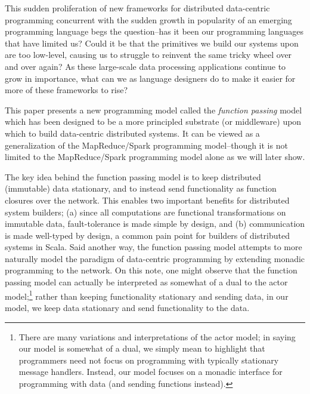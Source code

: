 \documentclass[10pt]{sigplanconf}
\theoremstyle{definition}
\theoremstyle{definition}
\begin{document}

This sudden proliferation of new frameworks for distributed data-centric
programming concurrent with the sudden growth in popularity of an emerging
programming language begs the question--has it been our programming languages
that have limited us? Could it be that the primitives we build our systems upon
are too low-level, causing us to struggle to reinvent the same tricky wheel over
and over again? As these large-scale data processing applications continue to
grow in importance, what can we as language designers do to make it easier for
more of these frameworks to rise?

This paper presents a new programming model called the {\em function passing}
model which has been designed to be a more principled substrate (or middleware)
upon which to build data-centric distributed systems. It can be viewed as a
generalization of the MapReduce/Spark programming model--though it is not
limited to the MapReduce/Spark programming model alone as we will later show.

The key idea behind the function passing model is to keep distributed
(immutable) data stationary, and to instead send functionality as function
closures over the network. This enables two important benefits for distributed
system builders; (a) since all computations are functional transformations on
immutable data, fault-tolerance is made simple by design, and (b) communication
is made well-typed by design, a common pain point for builders of distributed
systems in Scala. Said another way, the function passing model attempts to more
naturally model the paradigm of data-centric programming by extending monadic
programming to the network.
On this note, one might observe that the function passing model can actually be
interpreted as somewhat of a dual to the actor model;\footnote{There are many
variations and interpretations of the actor model; in saying our model is
somewhat of a dual, we simply mean to highlight that programmers need not focus
on programming with typically stationary message handlers. Instead, our model
focuses on a monadic interface for programming with data (and sending functions
instead).} rather than keeping functionality stationary and sending data, in our
model, we keep data stationary and send functionality to the data.
\end{document}
